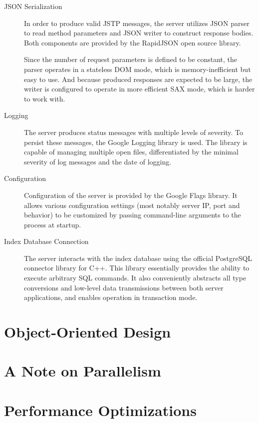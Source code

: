 \begin{description}
	\item[JSON Serialization]
	In order to produce valid JSTP messages, the server utilizes JSON parser to read method parameters and JSON writer to construct response bodies. Both components are provided by the RapidJSON open source library.

	Since the number of request parameters is defined to be constant, the parser operates in a stateless DOM mode, which is memory-inefficient but easy to use. And because produced responses are expected to be large, the writer is configured to operate in more efficient SAX mode, which is harder to work with.

	\item[Logging]
	The server produces status messages with multiple levels of severity. To persist these messages, the Google Logging library is used. The library is capable of managing multiple open files, differentiated by the minimal severity of log messages and the date of logging.

	\item[Configuration]
	Configuration of the server is provided by the Google Flags library. It allows various configuration settings (most notably server IP, port and behavior) to be customized by passing command-line arguments to the process at startup.

	\item[Index Database Connection]
	The server interacts with the index database using the official PostgreSQL connector library for C++. This library essentially provides the ability to execute arbitrary SQL commands. It also conveniently abstracts all type conversions and low-level data transmissions between both server applications, and enables operation in transaction mode.

\end{description}

\section{Object-Oriented Design}

\section{A Note on Parallelism}

\section{Performance Optimizations}
